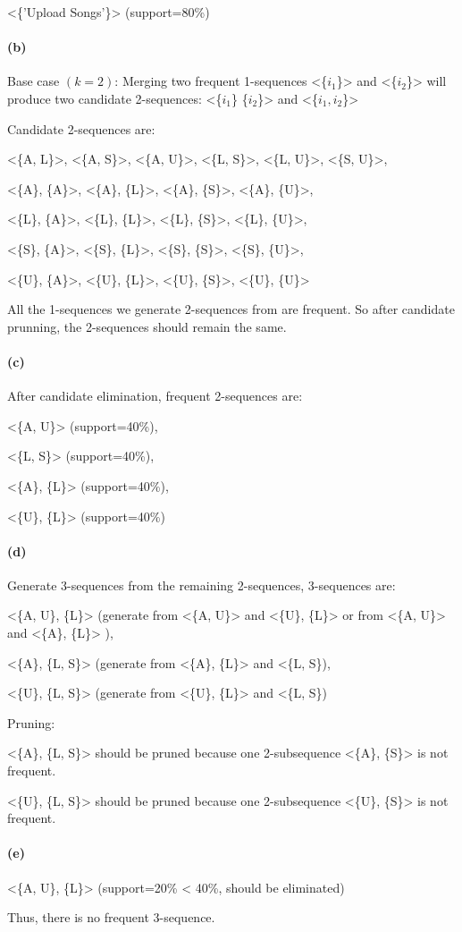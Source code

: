 \documentclass[en,black,normal,10pt]{elegantnote}
\begin{document}
<\{'Upload Songs'\}> (support=80\%)

\paragraph*{(b)}

Base case $(k=2)$: Merging two frequent 1-sequences <\{$i_1$\}> and <\{$i_2$\}> will produce two candidate 2-sequences: <\{$i_1$\} \{$i_2$\}> and <\{$i_1 , i_2$\}>

Candidate 2-sequences are:

<\{A, L\}>, <\{A, S\}>, <\{A, U\}>, <\{L, S\}>, <\{L, U\}>, <\{S, U\}>,

<\{A\}, \{A\}>, <\{A\}, \{L\}>, <\{A\}, \{S\}>, <\{A\}, \{U\}>, 

<\{L\}, \{A\}>, <\{L\}, \{L\}>, <\{L\}, \{S\}>, <\{L\}, \{U\}>, 

<\{S\}, \{A\}>, <\{S\}, \{L\}>, <\{S\}, \{S\}>, <\{S\}, \{U\}>, 

<\{U\}, \{A\}>, <\{U\}, \{L\}>, <\{U\}, \{S\}>, <\{U\}, \{U\}>

All the 1-sequences we generate 2-sequences from are frequent. So after candidate prunning, the 2-sequences should remain the same.

\paragraph*{(c)}

After candidate elimination, frequent 2-sequences are:

<\{A, U\}> (support=40\%),

<\{L, S\}> (support=40\%),

<\{A\}, \{L\}> (support=40\%),

<\{U\}, \{L\}> (support=40\%)

\paragraph*{(d)}

Generate 3-sequences from the remaining 2-sequences, 3-sequences are:

<\{A, U\}, \{L\}> (generate from <\{A, U\}> and <\{U\}, \{L\}> or from <\{A, U\}> and <\{A\}, \{L\}> ),

<\{A\}, \{L, S\}> (generate from <\{A\}, \{L\}> and <\{L, S\}),

<\{U\}, \{L, S\}> (generate from <\{U\}, \{L\}> and <\{L, S\})

Pruning:

<\{A\}, \{L, S\}> should be pruned because one 2-subsequence <\{A\}, \{S\}> is not frequent.

<\{U\}, \{L, S\}> should be pruned because one 2-subsequence <\{U\}, \{S\}> is not frequent.

\paragraph*{(e)}

<\{A, U\}, \{L\}> (support=20\% < 40\%, should be eliminated)

Thus, there is no frequent 3-sequence.
\end{document}
